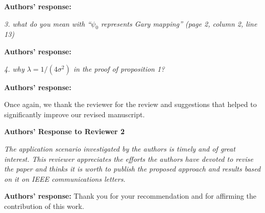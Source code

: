 \documentclass[onecolumn, 11pt, draftclsnofoot]{IEEEtran}
\begin{document}
\noindent \textbf{Authors' response:}

\vspace{0.5cm}

\noindent
\emph{3. what do you mean with ``$\psi_0$ represents Gary mapping'' (page 2,
column 2, line 13)}

\noindent \textbf{Authors' response:}


\vspace{0.5cm}

\noindent
\emph{4. why $\lambda = 1/(4\sigma^2)$ in the proof of proposition 1?}

\noindent \textbf{Authors' response:}

 
\vspace{0.5cm}


Once again, we thank the reviewer for the review and suggestions that helped to
significantly improve our revised manuscript. 

\newpage
\begin{center}
{\LARGE \textbf{Authors' Response to Reviewer 2}}
\end{center}

\noindent
\emph{The application scenario investigated by the authors is timely and of
great interest. This reviewer appreciates the efforts the authors have devoted
to revise the paper and thinks it is worth to publish the proposed approach and
results based on it on IEEE communications letters.}

\noindent \textbf{Authors' response:}
Thank you for your recommendation and for affirming the contribution of this work. 

\vspace{0.5cm}



\end{document}
